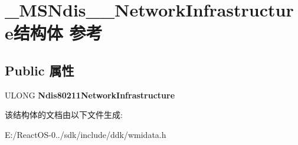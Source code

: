 \hypertarget{struct___m_s_ndis__80211___network_infrastructure}{}\section{\+\_\+\+M\+S\+Ndis\+\_\+\_\+\+Network\+Infrastructure结构体 参考}
\label{struct___m_s_ndis__80211___network_infrastructure}
\subsection*{Public 属性}
\begin{DoxyCompactItemize}
\item 
\mbox{\label{struct___m_s_ndis__80211___network_infrastructure_a5883bcec6777127779116abbfb72edb7}} 
U\+L\+O\+NG {\bfseries Ndis80211\+Network\+Infrastructure}
\end{DoxyCompactItemize}


该结构体的文档由以下文件生成\+:\begin{DoxyCompactItemize}
\item 
E\+:/\+React\+O\+S-\/0../sdk/include/ddk/wmidata.\+h\end{DoxyCompactItemize}
